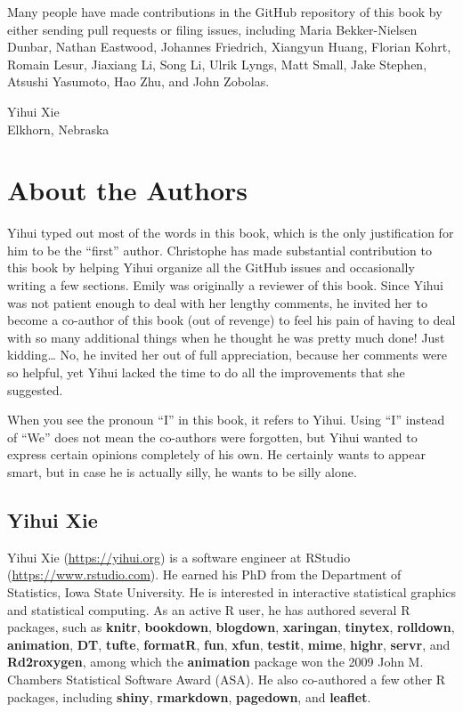 \documentclass[
  11pt,
]{krantz}
\begin{document}
Many people have made contributions in the GitHub repository of this book by either sending pull requests or filing issues, including Maria Bekker-Nielsen Dunbar, Nathan Eastwood, Johannes Friedrich, Xiangyun Huang, Florian Kohrt, Romain Lesur, Jiaxiang Li, Song Li, Ulrik Lyngs, Matt Small, Jake Stephen, Atsushi Yasumoto, Hao Zhu, and John Zobolas.

\begin{flushright}

Yihui Xie\\
Elkhorn, Nebraska

\end{flushright}

\hypertarget{author}{%
\chapter*{About the Authors}\label{author}}


Yihui typed out most of the words in this book, which is the only justification for him to be the ``first'' author. Christophe has made substantial contribution to this book by helping Yihui organize all the GitHub issues and occasionally writing a few sections. Emily was originally a reviewer of this book. Since Yihui was not patient enough to deal with her lengthy comments, he invited her to become a co-author of this book (out of revenge) to feel his pain of having to deal with so many additional things when he thought he was pretty much done! Just kidding\ldots{} No, he invited her out of full appreciation, because her comments were so helpful, yet Yihui lacked the time to do all the improvements that she suggested.

When you see the pronoun ``I'' in this book, it refers to Yihui. Using ``I'' instead of ``We'' does not mean the co-authors were forgotten, but Yihui wanted to express certain opinions completely of his own. He certainly wants to appear smart, but in case he is actually silly, he wants to be silly alone.

\hypertarget{yihui-xie}{%
\section*{Yihui Xie}\label{yihui-xie}}


Yihui Xie (\url{https://yihui.org}) is a software engineer at RStudio (\url{https://www.rstudio.com}). He earned his PhD from the Department of Statistics, Iowa State University. He is interested in interactive statistical graphics and statistical computing. As an active R user, he has authored several R packages, such as \textbf{knitr}, \textbf{bookdown}, \textbf{blogdown}, \textbf{xaringan}, \textbf{tinytex}, \textbf{rolldown}, \textbf{animation}, \textbf{DT}, \textbf{tufte}, \textbf{formatR}, \textbf{fun}, \textbf{xfun}, \textbf{testit}, \textbf{mime}, \textbf{highr}, \textbf{servr}, and \textbf{Rd2roxygen}, among which the \textbf{animation} package won the 2009 John M. Chambers Statistical Software Award (ASA). He also co-authored a few other R packages, including \textbf{shiny}, \textbf{rmarkdown}, \textbf{pagedown}, and \textbf{leaflet}.
\end{document}
